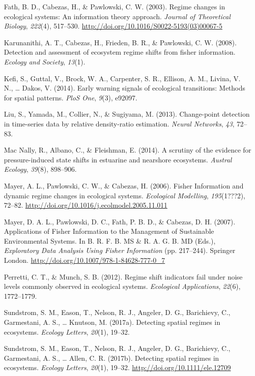 \documentclass[12pt,twoside,openany]{reedthesis}
\begin{document}
\hypertarget{ref-fath_regime_2003}{}
Fath, B. D., Cabezas, H., \& Pawlowski, C. W. (2003). Regime changes in
ecological systems: An information theory approach. \emph{Journal of
Theoretical Biology}, \emph{222}(4), 517--530.
\url{http://doi.org/10.1016/S0022-5193(03)00067-5}

\hypertarget{ref-karunanithi_detection_2008}{}
Karunanithi, A. T., Cabezas, H., Frieden, B. R., \& Pawlowski, C. W.
(2008). Detection and assessment of ecosystem regime shifts from fisher
information. \emph{Ecology and Society}, \emph{13}(1).

\hypertarget{ref-kefi2014early}{}
Kefi, S., Guttal, V., Brock, W. A., Carpenter, S. R., Ellison, A. M.,
Livina, V. N., \ldots{} Dakos, V. (2014). Early warning signals of
ecological transitions: Methods for spatial patterns. \emph{PloS One},
\emph{9}(3), e92097.

\hypertarget{ref-liu2013change}{}
Liu, S., Yamada, M., Collier, N., \& Sugiyama, M. (2013). Change-point
detection in time-series data by relative density-ratio estimation.
\emph{Neural Networks}, \emph{43}, 72--83.

\hypertarget{ref-mac2014scrutiny}{}
Mac Nally, R., Albano, C., \& Fleishman, E. (2014). A scrutiny of the
evidence for pressure-induced state shifts in estuarine and nearshore
ecosystems. \emph{Austral Ecology}, \emph{39}(8), 898--906.

\hypertarget{ref-mayer_fisher_2006}{}
Mayer, A. L., Pawlowski, C. W., \& Cabezas, H. (2006). Fisher
Information and dynamic regime changes in ecological systems.
\emph{Ecological Modelling}, \emph{195}(1???2), 72--82.
\url{http://doi.org/10.1016/j.ecolmodel.2005.11.011}

\hypertarget{ref-mayer_applications_2007}{}
Mayer, D. A. L., Pawlowski, D. C., Fath, P. B. D., \& Cabezas, D. H.
(2007). Applications of Fisher Information to the Management of
Sustainable Environmental Systems. In B. R. F. B. MS \& R. A. G. B. MD
(Eds.), \emph{Exploratory Data Analysis Using Fisher Information} (pp.
217--244). Springer London.
\url{http://doi.org/10.1007/978-1-84628-777-0_7}

\hypertarget{ref-perretti2012regime}{}
Perretti, C. T., \& Munch, S. B. (2012). Regime shift indicators fail
under noise levels commonly observed in ecological systems.
\emph{Ecological Applications}, \emph{22}(6), 1772--1779.

\hypertarget{ref-sundstrom_detecting_2017}{}
Sundstrom, S. M., Eason, T., Nelson, R. J., Angeler, D. G., Barichievy,
C., Garmestani, A. S., \ldots{} Knutson, M. (2017a). Detecting spatial
regimes in ecosystems. \emph{Ecology Letters}, \emph{20}(1), 19--32.

\hypertarget{ref-sundstrom2017detecting}{}
Sundstrom, S. M., Eason, T., Nelson, R. J., Angeler, D. G., Barichievy,
C., Garmestani, A. S., \ldots{} Allen, C. R. (2017b). Detecting spatial
regimes in ecosystems. \emph{Ecology Letters}, \emph{20}(1), 19--32.
\url{http://doi.org/10.1111/ele.12709}
\end{document}
